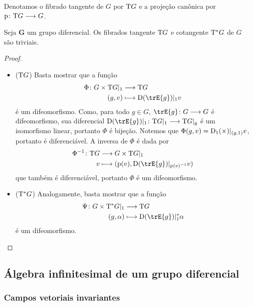 Denotamos o fibrado tangente de $G$ por $\mathrm{T} G$ e a projeção canônica por ${\mathrm{p}}\colon {\mathrm{T}G} \longrightarrow {G}$.

\begin{proposition}
Seja $\bm G$ um grupo diferencial. Os fibrados tangente $\mathrm{T} G$ e cotangente $\mathrm{T}^* G$ de $G$ são triviais.
\end{proposition}
\begin{proof}
\begin{itemize}
\item ($\mathrm{T} G$) Basta mostrar que a função
	\begin{align*}
	\func{\Phi}{G \times \Tg G|_1}{\Tg G}{(g,v)}{\D(\trE{g})|_1 v}
	\end{align*}
é um difeomorfismo. Como, para todo $g \in G$, $\fun{\trE{g}}{G}{G}$ é difeomorfismo, sua diferencial $\fun{\D(\trE{g})|_1}{\Tg G|_1}{\Tg G|_g}$ é um isomorfismo linear, portanto $\Phi$ é bijeção. Notemos que $\Phi(g,v) = \mathrm{D}_1(\times)|_{(g,1)}v$, portanto é diferenciável. A inversa de $\Phi$ é dada por
	\begin{align*}
		\func{\Phi\inv}{\Tg G}{G \times \Tg G|_1}{v}{(\proj(v),\D(\trE{g})|_{\proj(v)\inv}v)}
	\end{align*}
que também é diferenciável, portanto $\Phi$ é um difeomorfismo.

\item ($\mathrm{T}^* G$) Analogamente, basta mostrar que a função
	\begin{align*}
	\func{\Psi}{G \times \Tg^* G|_1}{\Tg G}{(g,\alpha)}{\D(\trE{g})|_1^* \alpha}
	\end{align*}
é um difeomorfismo.
\end{itemize}
\end{proof}

\subsection{Álgebra infinitesimal de um grupo diferencial}

\subsubsection{Campos vetoriais invariantes}

